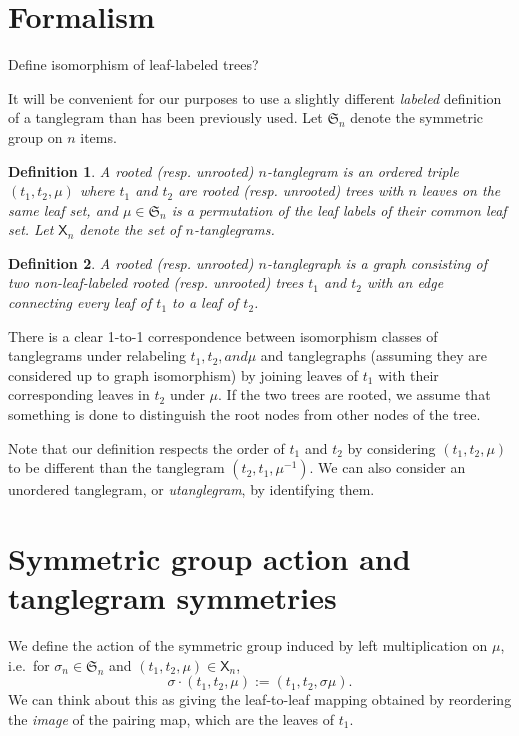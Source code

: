 \documentclass{amsart}
\newtheorem{definition}{Definition}
\newcommand{\fS}{\mathfrak S}
\newcommand{\pairing}{\mu}
\newcommand{\tangle}{\mathsf{X}}
\begin{document}
\section{Formalism}
Define isomorphism of leaf-labeled trees?

It will be convenient for our purposes to use a slightly different \emph{labeled} definition of a tanglegram than has been previously used.
Let $\fS_n$ denote the symmetric group on $n$ items.
\begin{definition}
\label{def:tanglegram}
A rooted (resp. unrooted) $n$-\emph{tanglegram} is an ordered triple $(t_1, t_2, \pairing)$ where $t_1$ and $t_2$ are rooted (resp. unrooted) trees with $n$ leaves on the same leaf set, and $\pairing \in \fS_n$ is a permutation of the leaf labels of their common leaf set.
Let $\tangle_n$ denote the set of $n$-tanglegrams.
\end{definition}
\begin{definition}
\label{def:tanglegraph}
A rooted (resp. unrooted) $n$-\emph{tanglegraph} is a graph consisting of two non-leaf-labeled rooted (resp. unrooted) trees $t_1$ and $t_2$ with an edge connecting every leaf of $t_1$ to a leaf of $t_2$.
\end{definition}
There is a clear 1-to-1 correspondence between isomorphism classes of tanglegrams under relabeling $t_1, t_2, and \pairing$ and tanglegraphs (assuming they are considered up to graph isomorphism) by joining leaves of $t_1$ with their corresponding leaves in $t_2$ under $\pairing$.
If the two trees are rooted, we assume that something is done to distinguish the root nodes from other nodes of the tree.

Note that our definition respects the order of $t_1$ and $t_2$ by considering $(t_1, t_2, \pairing)$ to be different than the tanglegram $(t_2, t_1, \pairing^{-1})$.
We can also consider an unordered tanglegram, or \emph{utanglegram}, by identifying them.


\section{Symmetric group action and tanglegram symmetries}
We define the action of the symmetric group induced by left multiplication on $\pairing$, i.e.\ for $\sigma_n \in \fS_n$ and $(t_1, t_2, \pairing) \in \tangle_n$,
\[
\sigma \cdot (t_1, t_2, \pairing) := (t_1, t_2, \sigma \pairing).
\]
We can think about this as giving the leaf-to-leaf mapping obtained by reordering the \emph{image} of the pairing map, which are the leaves of $t_1$.
\end{document}

